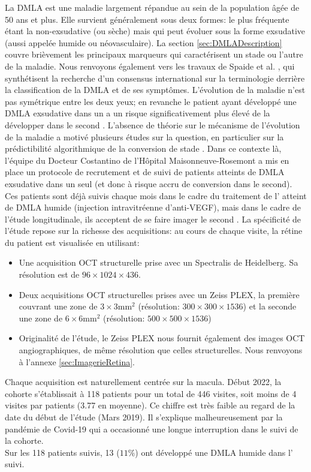 La DMLA est une maladie largement répandue au sein de la population âgée de 50 ans et plus. Elle survient généralement sous deux formes: le plus fréquente étant la non-exsudative (ou sèche) mais qui peut évoluer sous la forme exsudative (aussi appelée humide ou néovasculaire). La section \ref{sec:DMLADescription} couvre brièvement les principaux marqueurs qui caractérisent un stade ou l'autre de la maladie. Nous renvoyons également vers les travaux de Spaide et al. \cite{spaideConsensusNomenclatureReporting2020}, qui synthétisent la recherche d'un consensus international sur la terminologie derrière la classification de la DMLA et de ses symptômes. L'évolution de la maladie n'est pas symétrique entre les deux yeux; en revanche le patient ayant développé une DMLA exsudative dans un \oeil{} a un risque significativement plus élevé de la développer dans le second \cite{roySecondEyeInvolvement1990, gangnonSeverityAgeRelatedMacular2015}. L'absence de théorie sur le mécanisme de l'évolution de la maladie a motivé plusieurs études sur la question, en particulier sur la prédictibilité algorithmique de la conversion de stade \cite{schmidt-erfurthPredictionIndividualDisease2018, ASCRSPredictionImminent2023, yimPredictingConversionWet2020}. Dans ce contexte là, l'équipe du Docteur Costantino de l'Hôpital Maisonneuve-Rosemont a mis en place un protocole de recrutement et de suivi de patients atteints de DMLA exsudative dans un seul \oeil{} (et donc à risque accru de conversion dans le second). Ces patients sont déjà suivis chaque mois dans le cadre du traitement de l'\oeil{} atteint de DMLA humide (injection intravitréenne d'anti-VEGF), mais dans le cadre de l'étude longitudinale, ils acceptent de se faire imager le second \oeil{}. La spécificité de l'étude repose sur la richesse des acquisitions: au cours de chaque visite, la rétine du patient est visualisée en utilisant:
\begin{itemize}
	\item Une acquisition OCT structurelle prise avec un Spectralis de Heidelberg. Sa résolution est de $96 \times 1024 \times 436$. 
	\item Deux acquisitions OCT structurelles prises avec un Zeiss PLEX, la première couvrant une zone de $3\times 3$mm$^2$ (résolution: $300 \times 300 \times 1536$) et la seconde une zone de $6\times 6$mm$^2$ (résolution: $500 \times 500 \times 1536$)
	\item Originalité de l'étude, le Zeiss PLEX nous fournit également des images OCT angiographiques, de même résolution que celles structurelles. Nous renvoyons à l'annexe \ref{sec:ImagerieRetina}.
\end{itemize}
Chaque acquisition est naturellement centrée sur la macula. Début 2022, la cohorte s'établissait à 118 patients pour un total de 446 visites, soit moins de 4 visites par patients (3.77 en moyenne). Ce chiffre est très faible au regard de la date du début de l'étude (Mars 2019). Il s'explique malheureusement par la pandémie de Covid-19 qui a occasionné une longue interruption dans le suivi de la cohorte.
\\
Sur les 118 patients suivis, 13 ($11\%$) ont développé une DMLA humide dans l'\oeil{} suivi. 
